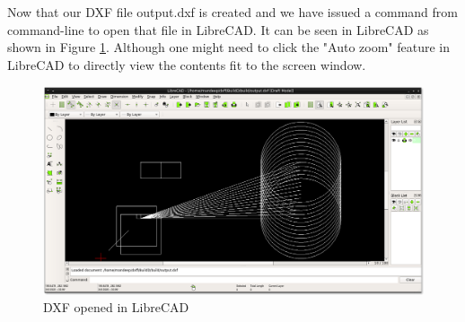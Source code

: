 \noindent Now that our DXF file output.dxf is created and we have issued a command from command-line to open that file in LibreCAD. It can be seen in LibreCAD as shown in Figure \ref{fig:lc}. Although one might need to click the "Auto zoom" feature in LibreCAD to directly view the contents fit to the screen window.

\begin{figure}
\centering
\includegraphics[scale=0.38]{images/bld5.png}
\caption{DXF opened in LibreCAD}
\label{fig:lc}
\end{figure}